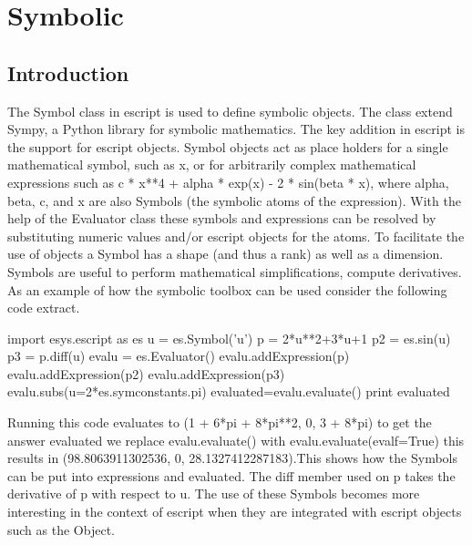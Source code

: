 \chapter{Symbolic}
\label{CHAP: Symbolic}
\section{Introduction}
The Symbol class in escript is used to define symbolic objects. The class extend Sympy\cite{Sympy}, a Python library for symbolic mathematics. The key 
addition in escript is the support for escript objects. Symbol objects act as place holders for a single mathematical symbol, 
such as x, or for arbitrarily complex mathematical expressions such as
c * x**4 + alpha * exp(x) - 2 * sin(beta * x), where alpha, beta, c, and x
are also Symbols (the symbolic atoms of the expression).
With the help of the Evaluator class these symbols and expressions can
be resolved by substituting numeric values and/or escript \Data objects
for the atoms. To facilitate the use of \Data objects a Symbol has a
shape (and thus a rank) as well as a dimension.
Symbols are useful to perform mathematical simplifications, compute
derivatives. As an example of how the symbolic toolbox can be used consider the following code extract.
\begin{python}
import esys.escript as es
u = es.Symbol('u')
p = 2*u**2+3*u+1
p2 = es.sin(u)
p3 = p.diff(u)
evalu = es.Evaluator()
evalu.addExpression(p)
evalu.addExpression(p2)
evalu.addExpression(p3)
evalu.subs(u=2*es.symconstants.pi)
evaluated=evalu.evaluate()
print evaluated
\end{python}
Running this code evaluates to (1 + 6*pi + 8*pi**2, 0, 3 + 8*pi) to get the answer evaluated we replace evalu.evaluate() with evalu.evaluate(evalf=True) this results in (98.8063911302536, 0, 28.1327412287183).This shows how the Symbols can be put into expressions and evaluated. The diff member used on p takes the derivative of p with respect to u. The use of these Symbols becomes more interesting in the context of escript when they are integrated with escript objects such as the \Data Object. 
